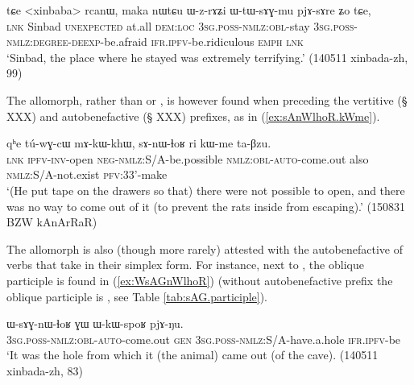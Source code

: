 \begin{exe}
\ex \label{ex:WzrAZi}
\gll tɕe <xinbaba> rcanɯ, maka nɯtɕu ɯ-z-rɤʑi ɯ-tɯ-sɤɣ-mu pjɤ-sɤre ʑo tɕe,\\
\textsc{lnk} Sinbad \textsc{unexpected} at.all \textsc{dem}:\textsc{loc} \textsc{3sg}.\textsc{poss}-\textsc{nmlz}:\textsc{obl}-stay \textsc{3sg}.\textsc{poss}-\textsc{nmlz}:\textsc{degree}-\textsc{deexp}-be.afraid \textsc{ifr}.\textsc{ipfv}-be.ridiculous \textsc{emph} \textsc{lnk}\\
\glt `Sinbad, the place where he stayed was extremely terrifying.' (140511 xinbada-zh, 99)
\end{exe}

The  allomorph, rather than  or , is however found when preceding the vertitive (§ XXX) and autobenefactive (§ XXX) prefixes, as in (\ref{ex:sAnWlhoR.kWme}).

\begin{exe}
\ex \label{ex:sAnWlhoR.kWme}
\gll  qʰe tú-wɣ-cɯ mɤ-kɯ-khɯ, sɤ-nɯ-ɬoʁ ri kɯ-me ta-βzu. \\
\textsc{lnk} \textsc{ipfv}-\textsc{inv}-open \textsc{neg}-\textsc{nmlz}:S/A-be.possible \textsc{nmlz}:\textsc{obl}-\textsc{auto}-come.out also \textsc{nmlz}:S/A-not.exist \textsc{pfv}:3\fl{}3'-make \\
\glt `(He put tape on the drawers so that) there were not possible to open, and there was no way to come out of it (to prevent the rats inside from escaping).' (150831 BZW kAnArRaR)
\end{exe}

The allomorph  is also (though more rarely) attested with the  autobenefactive of verbs that take  in their simplex form. For instance, next to , the oblique participle  is found in (\ref{ex:WsAGnWlhoR}) (without autobenefactive prefix the oblique participle is , see Table \ref{tab:sAG.participle}).

\begin{exe}
\ex \label{ex:WsAGnWlhoR}
\gll ɯ-sɤɣ-nɯ-ɬoʁ ɣɯ ɯ-kɯ-spoʁ pjɤ-ŋu.  \\
\textsc{3sg}.\textsc{poss}-\textsc{nmlz}:\textsc{obl}-\textsc{auto}-come.out \textsc{gen} \textsc{3sg}.\textsc{poss}-\textsc{nmlz}:S/A-have.a.hole \textsc{ifr}.\textsc{ipfv}-be \\
\glt `It was the hole from which it (the animal) came out (of the cave).  (140511 xinbada-zh, 83)
\end{exe} 


